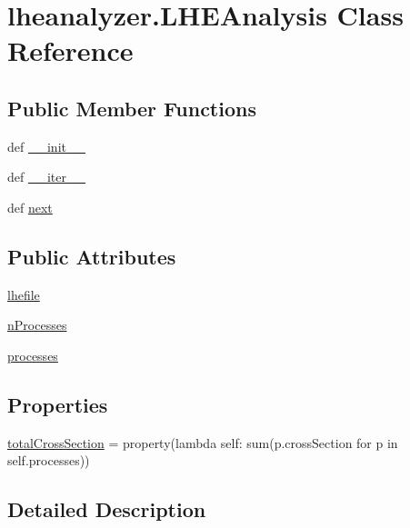 \section{lheanalyzer.\-L\-H\-E\-Analysis Class Reference}
\label{classlheanalyzer_1_1LHEAnalysis}
\subsection*{Public Member Functions}
\begin{DoxyCompactItemize}
\item 
def \hyperlink{classlheanalyzer_1_1LHEAnalysis_a300cb3429959f67b64702a5ccb73c0a9}{\-\_\-\-\_\-init\-\_\-\-\_\-}
\item 
def \hyperlink{classlheanalyzer_1_1LHEAnalysis_a3ac7127ca7aa72ba0740dcff971244ba}{\-\_\-\-\_\-iter\-\_\-\-\_\-}
\item 
def \hyperlink{classlheanalyzer_1_1LHEAnalysis_a5005ea511193e68cd23c2a4bc638e2e6}{next}
\end{DoxyCompactItemize}
\subsection*{Public Attributes}
\begin{DoxyCompactItemize}
\item 
\hyperlink{classlheanalyzer_1_1LHEAnalysis_ab12dd04f2a9aecc232ac401ac1cfcc15}{lhefile}
\item 
\hyperlink{classlheanalyzer_1_1LHEAnalysis_ab6d33644984aff27b1d286b3b44f95bd}{n\-Processes}
\item 
\hyperlink{classlheanalyzer_1_1LHEAnalysis_a9bf0d422138673c233f45ddf58a82941}{processes}
\end{DoxyCompactItemize}
\subsection*{Properties}
\begin{DoxyCompactItemize}
\item 
\hyperlink{classlheanalyzer_1_1LHEAnalysis_ab3e70c72f5d23349ee34f5dc59e71a93}{total\-Cross\-Section} = property(lambda self\-: sum(p.\-cross\-Section for p in self.\-processes))
\end{DoxyCompactItemize}


\subsection{Detailed Description}


